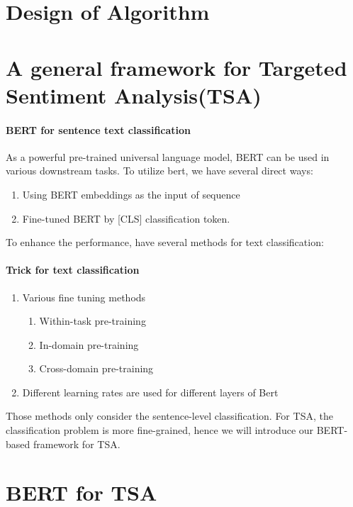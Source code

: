 \documentclass[fyp]{socreport}
\begin{document}
\section{Design of Algorithm}
\section{A general framework for Targeted Sentiment Analysis(TSA)}

\paragraph{BERT for sentence text classification}


As a powerful pre-trained universal language model, BERT can be used in various downstream tasks.
To utilize bert, we have several direct ways:
\begin{enumerate}
    \item Using BERT embeddings as the input of sequence
    \item Fine-tuned BERT by [CLS] classification token.
\end{enumerate}

To enhance the performance, \cite{sun2019finetune} have several methods for text classification: 


\paragraph{Trick for text classification}

\begin{enumerate}
    \item Various fine tuning methods
    \begin{enumerate}
        \item Within-task pre-training
        \item In-domain pre-training
        \item Cross-domain pre-training
    \end{enumerate}
    
    \item Different learning rates are used for different layers of Bert
\end{enumerate}


Those methods only consider the sentence-level classification. For TSA, the classification problem is more fine-grained, hence we will introduce our BERT-based framework for TSA.


\section{BERT for TSA}
\end{document}
